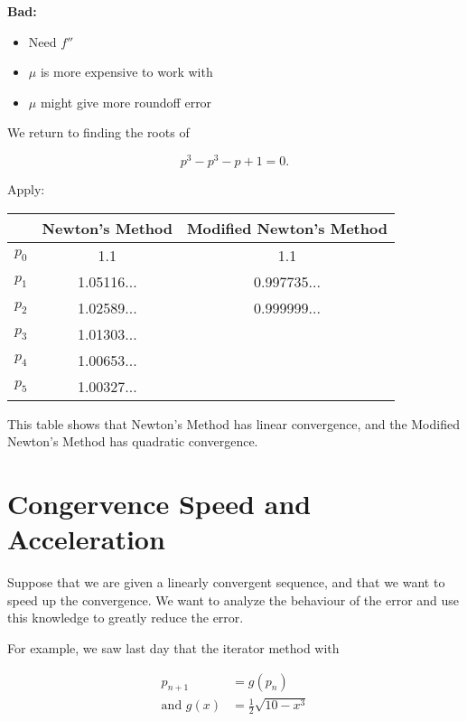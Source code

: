 \documentclass[12pt]{article}
\begin{document}
\textbf{Bad:}
\begin{itemize}
  \item Need $f''$
  \item $\mu$ is more expensive to work with
  \item $\mu$ might give more roundoff error
\end{itemize}

We return to finding the roots of

\[
p^3 - p^3 - p + 1 = 0
.\]

Apply:

\begin{table}[h]
    \centering
    \begin{tabular}{c c c}
        \toprule
         & Newton's Method & Modified Newton's Method \\
        \midrule
        $p_0$ & 1.1 & 1.1 \\
        $p_1$ & 1.05116... & 0.997735... \\
        $p_2$ & 1.02589... & 0.999999... \\
        $p_3$ & 1.01303... &  \\
        $p_4$ & 1.00653... &  \\
        $p_5$ & 1.00327... &  \\
        \bottomrule
    \end{tabular}
\end{table}

This table shows that Newton's Method has linear convergence, and the Modified
Newton's Method has quadratic convergence.

\section{Congervence Speed and Acceleration}

Suppose that we are given a linearly convergent sequence, and that we want to
speed up the convergence. We want to analyze the behaviour of the error and use
this knowledge to greatly reduce the error. 

For example, we saw last day that the iterator method with 

\begin{align*}
  p_{n+1} &= g(p_n) \\
  \text{and } g(x) &= \frac{1}{2}\sqrt{10-x^3}
\end{align*}
\end{document}
